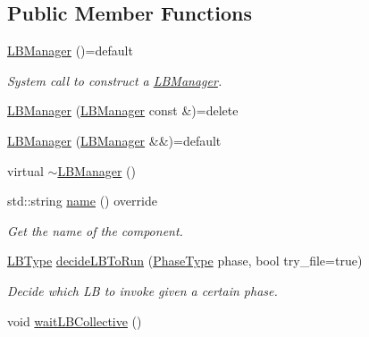 \subsection*{Public Member Functions}
\begin{DoxyCompactItemize}
\item 
\hyperlink{structvt_1_1vrt_1_1collection_1_1balance_1_1_l_b_manager_a4adad6931af7d5ff2cb983859ed939f3}{L\+B\+Manager} ()=default
\begin{DoxyCompactList}\small\item\em System call to construct a {\ttfamily \hyperlink{structvt_1_1vrt_1_1collection_1_1balance_1_1_l_b_manager}{L\+B\+Manager}}. \end{DoxyCompactList}\item 
\hyperlink{structvt_1_1vrt_1_1collection_1_1balance_1_1_l_b_manager_af361eb6d3fa35d04873fcbe74b315d4a}{L\+B\+Manager} (\hyperlink{structvt_1_1vrt_1_1collection_1_1balance_1_1_l_b_manager}{L\+B\+Manager} const \&)=delete
\item 
\hyperlink{structvt_1_1vrt_1_1collection_1_1balance_1_1_l_b_manager_ab5efdf949166922f70cb49d171bf509a}{L\+B\+Manager} (\hyperlink{structvt_1_1vrt_1_1collection_1_1balance_1_1_l_b_manager}{L\+B\+Manager} \&\&)=default
\item 
virtual \hyperlink{structvt_1_1vrt_1_1collection_1_1balance_1_1_l_b_manager_a1b2c452667a70cbd1287969c32f538f1}{$\sim$\+L\+B\+Manager} ()
\item 
std\+::string \hyperlink{structvt_1_1vrt_1_1collection_1_1balance_1_1_l_b_manager_a8e18e972cf9e8658da9577d45e090698}{name} () override
\begin{DoxyCompactList}\small\item\em Get the name of the component. \end{DoxyCompactList}\item 
\hyperlink{namespacevt_1_1vrt_1_1collection_1_1balance_ac4f99693509affcc67db182d4aad9b5c}{L\+B\+Type} \hyperlink{structvt_1_1vrt_1_1collection_1_1balance_1_1_l_b_manager_a6c610e1c053f986932d8a59bb89eb37d}{decide\+L\+B\+To\+Run} (\hyperlink{namespacevt_a46ce6733d5cdbd735d561b7b4029f6d7}{Phase\+Type} phase, bool try\+\_\+file=true)
\begin{DoxyCompactList}\small\item\em Decide which LB to invoke given a certain phase. \end{DoxyCompactList}\item 
void \hyperlink{structvt_1_1vrt_1_1collection_1_1balance_1_1_l_b_manager_a2923d77f512a955194589450cbb85b80}{wait\+L\+B\+Collective} ()

\end{DoxyCompactItemize}
